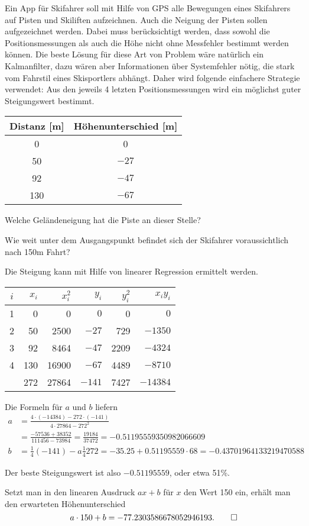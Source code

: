 Ein App für Skifahrer soll mit Hilfe von GPS alle Bewegungen
eines Skifahrers auf Pisten und Skiliften aufzeichnen.
Auch die Neigung der Pisten sollen aufgezeichnet werden.
Dabei muss berücksichtigt werden, dass sowohl die
Positionsmessungen als auch die Höhe nicht ohne Messfehler
bestimmt werden können.  Die beste Lösung für diese Art
von Problem wäre natürlich ein Kalmanfilter, dazu wären
aber Informationen über Systemfehler nötig, die stark vom Fahrstil
eines Skisportlers abhängt.  Daher wird folgende einfachere
Strategie verwendet: Aus den jeweils 4 letzten Positionsmessungen
wird ein möglichst guter Steigungswert bestimmt.
\begin{center}
\begin{tabular}{cc}
Distanz [m]&Höhenunterschied [m]\\
\hline
 0&    0\\
50&$-27$\\
92&$-47$\\
130&$-67$\\
\hline
\end{tabular}
\end{center}
\begin{teilaufgaben}
\item
Welche Geländeneigung hat die Piste an dieser Stelle?
\item
Wie weit unter dem Ausgangspunkt befindet sich der Skifahrer
voraussichtlich nach 150m Fahrt?
\end{teilaufgaben}

\begin{loesung}
Die Steigung kann mit Hilfe von linearer Regression ermittelt werden.
\begin{center}
\begin{tabular}{|c|rr|rr|r|}
\hline
$i$&$x_i$&$x_i^2$&$y_i$&$y_i^2$&$x_iy_i$\\
\hline
1&  0&    0&$   0$&   0&$    0$\\
2& 50& 2500&$ -27$& 729&$ -1350$\\
3& 92& 8464&$ -47$&2209&$ -4324$\\
4&130&16900&$ -67$&4489&$ -8710$\\
\hline
 &272&27864&$-141$&7427&$-14384$\\
\hline
\end{tabular}
\end{center}
Die Formeln für $a$ und $b$ liefern
\begin{align*}
a
&=\frac{4\cdot(-14384)-272\cdot (-141)}{4\cdot 27864 - 272^2}
\\
&=
\frac{-57536+38352}{111456-73984}
=
\frac{19184}{37472}=-0.51195559350982066609
\\
b
&=
\frac14(-141)-a\frac14272
=-35.25 + 0.51195559\cdot 68=-0.43701964133219470588
\end{align*}
\begin{teilaufgaben}
\item Der beste Steigungswert ist also $-0.51195559$, oder etwa 51\%.
\item Setzt man in den linearen Ausdruck $ax+b$ für $x$ den Wert
150 ein, erhält man den erwarteten Höhenunterschied
\[
a\cdot 150 + b= 
-77.2303586678052946193.
\qedhere
\]
\end{teilaufgaben}
\end{loesung}

